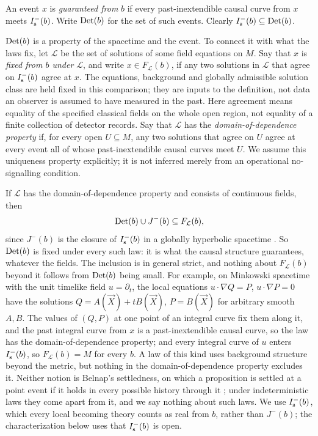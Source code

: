 \begin{definition}
An event $x$ is \emph{guaranteed from} $b$ if every past-inextendible causal
curve from $x$ meets $I^-_{\mathrm s}(b)$. Write $\mathrm{Det}(b)$ for the set of such events.
Clearly $I^-_{\mathrm s}(b)\subseteq\mathrm{Det}(b)$.
\end{definition}

$\mathrm{Det}(b)$ is a property of the spacetime and the event. To connect it with
what the laws fix, let $\mathcal L$ be the set of solutions of some field
equations on $M$. Say that $x$ is \emph{fixed from $b$ under $\mathcal L$},
and write $x\in F_{\mathcal L}(b)$, if any two solutions in $\mathcal L$ that
agree on $I^-_{\mathrm s}(b)$ agree at $x$. The equations, background and globally
admissible solution class are held fixed in this comparison; they are inputs
to the definition, not data an observer is assumed to have measured in the
past. Here agreement means equality of the specified classical fields on the
whole open region, not equality of a finite collection of detector records.
Say that $\mathcal L$ has the
\emph{domain-of-dependence property} if, for every open $U\subseteq M$, any two
solutions that agree on $U$ agree at every event all of whose
past-inextendible causal curves meet $U$. We assume this uniqueness property
explicitly; it is not inferred merely from an operational no-signalling
condition.

\begin{remark}\label{rem:laws}
If $\mathcal L$ has the domain-of-dependence property and consists of
continuous fields, then
\[\mathrm{Det}(b)\cup J^-(b)\subseteq F_{\mathcal L}(b),\]
since $J^-(b)$ is the closure of $I^-_{\mathrm s}(b)$ in a globally hyperbolic spacetime
\citep{MS2008}. So $\mathrm{Det}(b)$ is fixed under every such law: it is what the
causal structure guarantees, whatever the fields. The inclusion is in general
strict, and nothing about $F_{\mathcal L}(b)$ beyond it follows from $\mathrm{Det}(b)$
being small. For example, on Minkowski spacetime with the unit timelike
field $u=\partial_t$, the local equations $u\cdot\nabla Q=P$,
$u\cdot\nabla P=0$ have the solutions $Q=A(\vec X)+tB(\vec X)$, $P=B(\vec X)$
for arbitrary smooth $A,B$. The values of $(Q,P)$ at one point of an integral curve fix them along
it, and the past integral curve from $x$ is a past-inextendible causal curve,
so the law has the domain-of-dependence property; and every integral curve
of $u$ enters $I^-_{\mathrm s}(b)$, so $F_{\mathcal L}(b)=M$ for every $b$. A law of this
kind uses background structure beyond the metric, but nothing in the
domain-of-dependence property excludes it. Neither notion is Belnap's
settledness, on which a proposition is settled at a point event if it holds
in every possible history through it \citep{Belnap1992}; under
indeterministic laws they come apart from it, and we say nothing about such
laws. We use $I^-_{\mathrm s}(b)$, which every local becoming theory counts as real from
$b$, rather than $J^-(b)$; the characterization below uses that $I^-_{\mathrm s}(b)$ is
open.
\end{remark}

